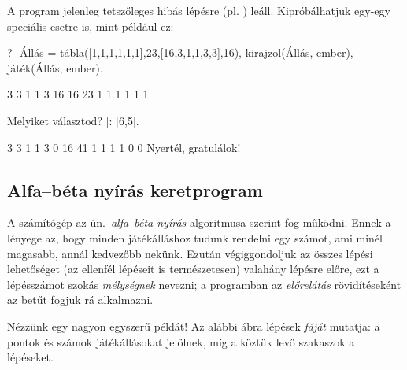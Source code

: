 A program jelenleg tetszőleges hibás lépésre
(pl. ) leáll. Kipróbálhatjuk egy-egy
speciális esetre is, mint például ez:
\begin{query}
?- Állás = tábla([1,1,1,1,1,1],23,[16,3,1,1,3,3],16),
   kirajzol(Állás, ember), játék(Állás, ember).

     3    3    1    1    3    16
16                                  23
     1    1    1    1    1    1

Melyiket választod?
|: [6,5].

     3    3    1    1    3    0
16                                  41
     1    1    1    1    0    0
Nyertél, gratulálok!
\end{query}

\subsection*{Alfa--béta nyírás keretprogram}
A számítógép az ún.~\emph{alfa--béta nyírás}
algoritmusa szerint fog működni. Ennek a lényege az,
hogy minden játékálláshoz tudunk rendelni egy
számot, ami minél magasabb, annál kedvezőbb
nekünk. Ezután végiggondoljuk az összes lépési
lehetőséget (az ellenfél lépéseit is természetesen)
valahány lépésre előre, ezt a lépésszámot szokás
\emph{mélységnek} nevezni; a programban az
\emph{előrelátás} rövidítéseként az  betűt
fogjuk rá alkalmazni.

Nézzünk egy nagyon egyszerű példát! Az alábbi ábra
lépések \emph{fáját} mutatja: a pontok és számok
játékállásokat jelölnek, míg a köztük levő szakaszok
a lépéseket.

\begin{center}
\end{center}

